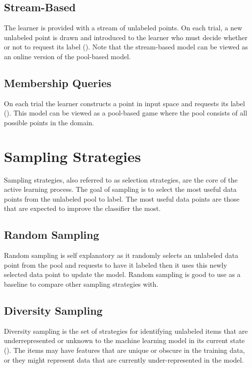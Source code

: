 \subsection{Stream-Based}
The learner is provided with a stream of unlabeled points. On each trial, a new unlabeled point is drawn and introduced to the learner who must decide whether or not to request its label (\cite{baram2004online}). Note that the stream-based model can be viewed as an online version of the pool-based model. 

\subsection{Membership Queries}
On each trial the learner constructs a point in input space and requests its label (\cite{baram2004online}). This model can be viewed as a pool-based game where the pool consists of all possible points in the domain.

\section{Sampling Strategies}

Sampling strategies, also referred to as selection strategies, are the core of the active learning process. The goal of sampling is to select the most useful data points from the unlabeled pool to label. The most useful data points are those that are expected to improve the classifier the most.

\subsection{Random Sampling}
Random sampling is self explanatory as it randomly selects an unlabeled data point from the pool and requests to have it labeled then it uses this newly selected data point to update the model. Random sampling is good to use as a baseline to compare other sampling strategies with.

\subsection{Diversity Sampling}
Diversity sampling is the set of strategies for identifying unlabeled items that are underrepresented or unknown to the machine learning model in its current state (\cite{munro2021human}). The items may have features that are unique or obscure in the training data, or they might represent data that are currently under-represented in the model. 

